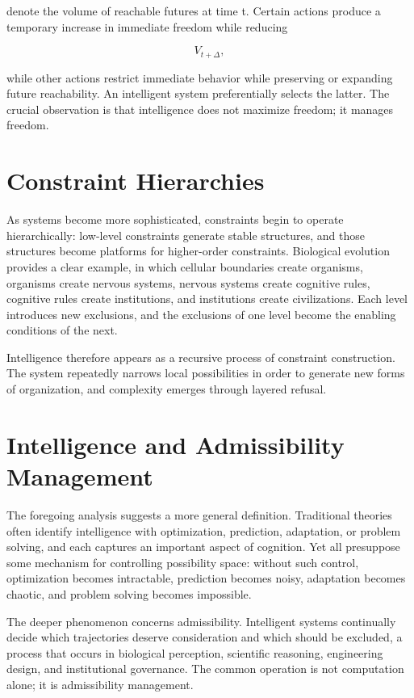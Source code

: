 \documentclass[11pt,oneside]{book}
\theoremstyle{plain}
\theoremstyle{definition}
\theoremstyle{remark}
\begin{document}
denote the volume of reachable futures at time t. Certain actions produce a temporary increase in immediate freedom while reducing

\begin{equation}
V_{t+\Delta},
\end{equation}

while other actions restrict immediate behavior while preserving or expanding future reachability. An intelligent system preferentially selects the latter. The crucial observation is that intelligence does not maximize freedom; it manages freedom.

\section{Constraint Hierarchies}

As systems become more sophisticated, constraints begin to operate hierarchically: low-level constraints generate stable structures, and those structures become platforms for higher-order constraints. Biological evolution provides a clear example, in which cellular boundaries create organisms, organisms create nervous systems, nervous systems create cognitive rules, cognitive rules create institutions, and institutions create civilizations. Each level introduces new exclusions, and the exclusions of one level become the enabling conditions of the next.

Intelligence therefore appears as a recursive process of constraint construction. The system repeatedly narrows local possibilities in order to generate new forms of organization, and complexity emerges through layered refusal.

\section{Intelligence and Admissibility Management}

The foregoing analysis suggests a more general definition. Traditional theories often identify intelligence with optimization, prediction, adaptation, or problem solving, and each captures an important aspect of cognition. Yet all presuppose some mechanism for controlling possibility space: without such control, optimization becomes intractable, prediction becomes noisy, adaptation becomes chaotic, and problem solving becomes impossible.

The deeper phenomenon concerns admissibility. Intelligent systems continually decide which trajectories deserve consideration and which should be excluded, a process that occurs in biological perception, scientific reasoning, engineering design, and institutional governance. The common operation is not computation alone; it is admissibility management.
\end{document}
